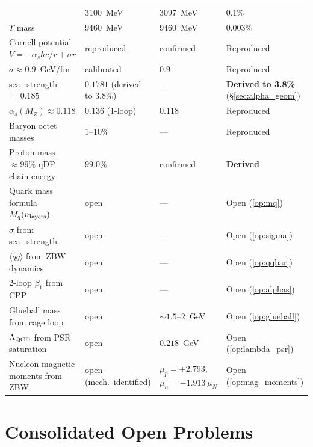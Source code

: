 \documentclass[11pt,letterpaper]{article}
\newcommand{\as}{\alpha_s}
\newcommand{\qqbar}{\langle\bar{q}q\rangle}
\begin{document}
\begin{longtable}{@{}p{5.5cm}p{2.5cm}p{2.5cm}l@{}}
  & $3100$~MeV & $3097$~MeV & $0.1\%$ \\
$\Upsilon$ mass
  & $9460$~MeV & $9460$~MeV & $0.003\%$ \\
Cornell potential $V=-\as\hbar c/r+\sigma r$
  & reproduced & confirmed & Reproduced \\
$\sigma \approx 0.9$~GeV/fm
  & calibrated & $0.9$ & Reproduced \\
sea\_strength $= 0.185$
  & $0.1781$ (derived to $3.8\%$) & --- & \textbf{Derived to 3.8\%} (\S\ref{sec:alpha_geom}) \\
$\as(M_Z) \approx 0.118$
  & $0.136$ (1-loop) & $0.118$ & Reproduced \\
Baryon octet masses
  & $1\text{--}10\%$ & --- & Reproduced \\
Proton mass $\approx99\%$ qDP chain energy
  & $99.0\%$ & confirmed & \textbf{Derived} \\
Quark mass formula $M_q(n_{\rm layers})$
  & open & --- & Open (\ref{op:mq}) \\
$\sigma$ from sea\_strength
  & open & --- & Open (\ref{op:sigma}) \\
$\qqbar$ from ZBW dynamics
  & open & --- & Open (\ref{op:qqbar}) \\
2-loop $\beta_1$ from CPP
  & open & --- & Open (\ref{op:alphas}) \\
Glueball mass from cage loop
  & open & $\sim1.5\text{--}2$~GeV & Open (\ref{op:glueball}) \\
$\Lambda_{\rm QCD}$ from PSR saturation
  & open & $0.218$~GeV & Open (\ref{op:lambda_psr}) \\
Nucleon magnetic moments from ZBW
  & open (mech.\ identified) & $\mu_p=+2.793$, $\mu_n=-1.913\,\mu_N$ & Open (\ref{op:mag_moments}) \\
\end{longtable}

\section{Consolidated Open Problems}
\label{sec:openproblems}
\end{document}
